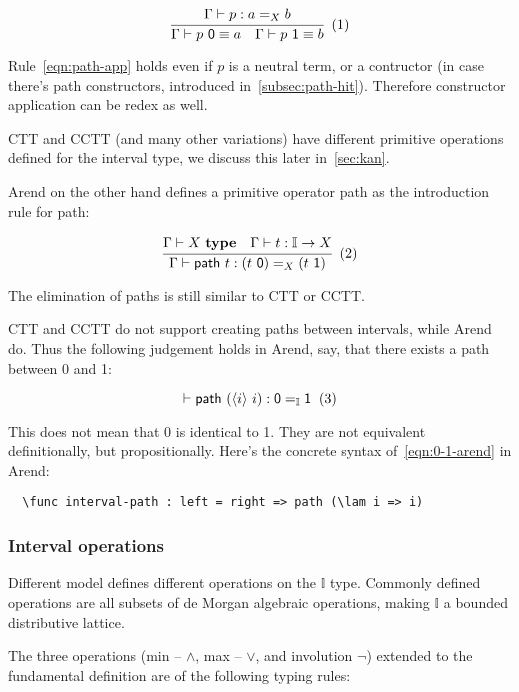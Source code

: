 \[
  \cfrac{
    \Gamma \vdash p : a =_X b
  }{
    \Gamma \vdash p~\textsf 0 \equiv a
    \quad
    \Gamma \vdash p~\textsf 1 \equiv b
  }
  \xtag \label{eqn:path-app}
\]

Rule~\ref{eqn:path-app} holds even if $p$ is a neutral term,
or a contructor (in case there's path constructors,
introduced in~\cref{subsec:path-hit}).
Therefore constructor application can be redex as well.

CTT and CCTT (and many other variations) have different primitive
operations defined for the interval type,
we discuss this later in~\cref{sec:kan}.

Arend on the other hand defines a primitive operator \textsf{path}
as the introduction rule for path:

\[
  \cfrac{
    \Gamma \vdash X~\textbf{type}
    \quad
    \Gamma \vdash t : \mathbb I \rightarrow X
  }{
    \Gamma \vdash \textsf{path}~t : (t~\textsf 0) =_X (t~\textsf 1)
  }
  \xtag
\]

The elimination of paths is still similar to CTT or CCTT.

CTT and CCTT do not support creating paths between intervals,
while Arend do.
Thus the following judgement holds in Arend, say,
that there exists a path between \textsf 0 and \textsf 1:

\[
  \vdash \textsf{path}~(\lrangle i~i) : \textsf 0 =_{\mathbb I} \textsf 1
  \xtag \label{eqn:0-1-arend}
\]

This does not mean that \textsf 0 is identical to \textsf 1.
They are not equivalent definitionally, but propositionally.
Here's the concrete syntax of~\ref{eqn:0-1-arend} in Arend:

\begin{verbatim}
  \func interval-path : left = right => path (\lam i => i)
\end{verbatim}

\subsubsection{Interval operations}

Different model defines different operations on the $\mathbb I$ type.
Commonly defined operations are all subsets of de Morgan algebraic operations,
making $\mathbb I$ a bounded distributive lattice.

The three operations (min -- $\wedge$, max -- $\vee$, and involution $\neg$)
extended to the fundamental definition are of the following typing rules:

